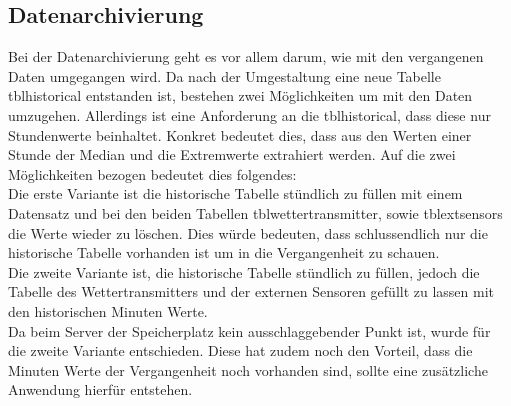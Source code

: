 \subsection{Datenarchivierung}
Bei der Datenarchivierung geht es vor allem darum, wie mit den vergangenen Daten umgegangen wird. Da nach der Umgestaltung eine neue Tabelle tblhistorical entstanden ist, bestehen zwei Möglichkeiten um mit den Daten umzugehen. Allerdings ist eine Anforderung an die tblhistorical, dass diese nur Stundenwerte beinhaltet. Konkret bedeutet dies, dass aus den Werten einer Stunde der Median und die Extremwerte extrahiert werden. Auf die zwei Möglichkeiten bezogen bedeutet dies folgendes: \\
Die erste Variante ist die historische Tabelle stündlich zu füllen mit einem Datensatz und bei den beiden Tabellen tblwettertransmitter, sowie tblextsensors die Werte wieder zu löschen. Dies würde bedeuten, dass schlussendlich nur die historische Tabelle vorhanden ist um in die Vergangenheit zu schauen.\\
Die zweite Variante ist, die historische Tabelle stündlich zu füllen, jedoch die Tabelle des Wettertransmitters und der externen Sensoren gefüllt zu lassen mit den historischen Minuten Werte.\\
Da beim Server der Speicherplatz kein ausschlaggebender Punkt ist, wurde für die zweite Variante entschieden. Diese hat zudem noch den Vorteil, dass die Minuten Werte der Vergangenheit noch vorhanden sind, sollte eine zusätzliche Anwendung hierfür entstehen.


